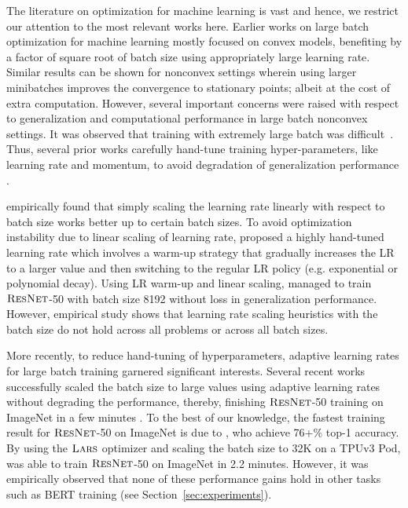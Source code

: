 The literature on optimization for machine learning is vast and hence, we restrict our attention to the most relevant works here. Earlier works on large batch optimization for machine learning mostly focused on convex models, benefiting by a factor of square root of batch size using appropriately large learning rate. Similar results can be shown for nonconvex settings wherein using larger minibatches improves the convergence to stationary points; albeit at the cost of extra computation. However, several important concerns were raised with respect to generalization and computational performance in large batch nonconvex settings. It was observed that training with extremely large batch was difficult~\citep{keskar2016large, hoffer2017train}. Thus, several prior works carefully hand-tune training hyper-parameters, like learning rate and momentum, to avoid degradation of generalization performance \citep{goyal2017accurate, li2017scaling, you2018imagenet, shallue2018measuring}. 

\citep{krizhevsky2014one} empirically found that simply scaling the learning rate linearly with respect to batch size works better up to certain batch sizes. To avoid optimization instability due to linear scaling of learning rate, \citet{goyal2017accurate} proposed a highly hand-tuned learning rate which involves a warm-up strategy that gradually increases the LR to a larger value and then switching to the regular LR policy (e.g. exponential or polynomial decay). Using LR warm-up and linear scaling, \citet{goyal2017accurate} managed to train $\textsc{ResNet}$-50 with batch size 8192 without loss in generalization performance. However, empirical study \citep{shallue2018measuring} shows that learning rate scaling heuristics with the batch size do not hold across all problems or across all batch sizes.

More recently, to reduce hand-tuning of hyperparameters, adaptive learning rates for large batch training garnered significant interests. Several recent works successfully scaled the batch size to large values using adaptive learning rates without degrading the performance, thereby, finishing $\textsc{ResNet}$-50 training on ImageNet in a few minutes \citep{you2018imagenet,iandola2016firecaffe,codreanu2017scale,akiba2017extremely,jia2018highly,smith2017don,martens2015optimizing,devarakonda2017adabatch,mikami2018imagenet,osawa2018second,you2019large,yamazaki2019yet}.
To the best of our knowledge, the fastest training result for $\textsc{ResNet}$-50 on ImageNet is due to \cite{ying2018image}, who achieve 76+\% top-1 accuracy. By using the $\textsc{Lars}$ optimizer and scaling the batch size to 32K  on a TPUv3 Pod, \citet{ying2018image} was able to train $\textsc{ResNet}$-50 on ImageNet in 2.2 minutes. However, it was empirically observed that none of these performance gains hold in other tasks such as BERT training (see Section~\ref{sec:experiments}).  


